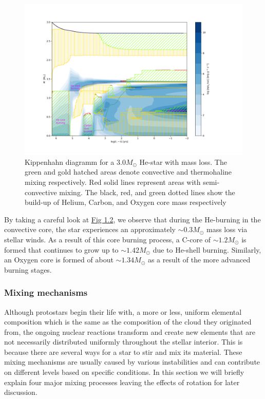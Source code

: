 \documentclass[../../main/thesis_msc.tex]{subfiles}
\begin{document}
				\begin{figure}[h]
					\centering
					\includegraphics[width=\textwidth]{../figures/chapter1/Kippenhahn_3p0_ch1_with_text_magenta.png}
					\caption{Kippenhahn diagramm for a $3.0 M_{\odot}$ He-star with mass loss. The green and gold hatched areas denote convective and thermohaline mixing respectively. Red solid lines represent areas with semi-convective mixing. The black, red, and green dotted lines show the build-up of Helium, Carbon, and Oxygen core mass respectively}
					\label{fig:Kipp_3p0_ch1}
				\end{figure}
				
				By taking a careful look at \hyperref[fig:Kipp_3p0_ch1]{Fig 1.2}, we observe that during the He-burning in the convective core, the star experiences an approximately $\sim 0.3 M_{\odot}$ mass loss via stellar winds. As a result of this core burning process, a C-core of $\sim 1.2 M_{\odot}$ is formed that continues to grow up to $\sim 1.42 M_{\odot}$ due to He-shell burning. Similarly, an Oxygen core is formed of about $\sim 1.34 M_{\odot}$ as a result of the more advanced burning stages.
				
				
				
				
				
				
					\subsubsection{Mixing mechanisms}
					
						Although protostars begin their life with, a more or less, uniform elemental composition which is the same as the composition of the cloud they originated from, the ongoing nuclear reactions transform and create new elements that are not necessarily distributed uniformly throughout the stellar interior. This is because there are several ways for a star to stir and mix its material. These mixing mechanisms are usually caused by various instabilities and can contribute on different levels based on specific conditions. In this section we will briefly explain four major mixing processes leaving the effects of rotation for later discussion.
						
\end{document}
